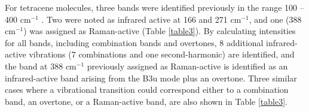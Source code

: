    For tetracene molecules, three bands were identified previously in the range 100 – 400 cm$^{-1}$ \cite{michaelian2012far,malloci2007time}. Two were noted as infrared active at 166 and 271 cm$^{-1}$, and one (388 cm$^{-1}$) was assigned as Raman-active (Table \ref{table3}). By calculating intensities for all bands, including combination bands and overtones, 8 additional infrared- active vibrations (7 combinations and one second-harmonic) are identified, and the band at 388 cm$^{-1}$ previously assigned as Raman-active is identified as an infrared-active band arising from the B3u mode plus an overtone. Three similar cases where a vibrational transition could correspond either to a  combination band, an overtone, or a Raman-active band, are also shown in Table \ref{table3}.
    
    
  \begin{table}[H]
  	\caption{Experimental and calculated wavenumbers (cm-1) for fundamental and combination vibrational modes for pentacene.}
  	\begin{center}
  		\begin{threeparttable}[b]
\end{threeparttable}
\end{center}
\end{table}
